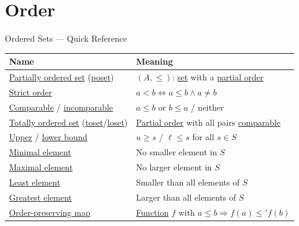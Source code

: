 \section{Order}

%

\begin{toolkitbox}{Ordered Sets --- Quick Reference}
\small
\begin{tabular}{l l}
\toprule
\textbf{Name}  & \textbf{Meaning} \\
\midrule
\hyperref[def:partially-ordered-set]{Partially ordered set}
(\hyperref[def:poset]{poset})  & $(A, \leq)$: \hyperref[def:set-membership]{set} with a \hyperref[def:partial-order]{partial order}        \\
\hyperref[def:strict-order]{Strict order}        & $a < b \iff a \leq b \land a \neq b$                         \\
\hyperref[def:comparable]{Comparable} / \hyperref[def:incomparable]{incomparable}  & $a \leq b$ or $b \leq a$ / neither              \\
\hyperref[def:totally-ordered-set]{Totally ordered set}
(\hyperref[def:toset]{toset}/\hyperref[def:loset]{loset})  & \hyperref[def:partial-order]{Partial order} with all pairs \hyperref[def:comparable]{comparable}                  \\
\hyperref[def:upper-bound]{Upper} / \hyperref[def:lower-bound]{lower bound}  & $u \geq s$ / $\ell \leq s$ for all $s \in S$               \\
\hyperref[def:order-minimal-element]{Minimal element}   & No smaller element in $S$                            \\
\hyperref[def:order-maximal-element]{Maximal element}   & No larger element in $S$                             \\
\hyperref[def:order-least-element]{Least element}    & Smaller than all elements of $S$                     \\
\hyperref[def:order-greatest-element]{Greatest element}    & Larger than all elements of $S$                     \\
\hyperref[def:order-preserving-map-ordered-sets]{Order-preserving map}    & \hyperref[def:function]{Function} $f$ with $a \leq b \Rightarrow f(a) \leq' f(b)$                       \\

\end{tabular}
\end{toolkitbox}
